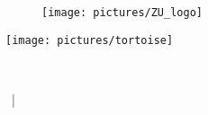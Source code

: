 
\begin{figure}[t]
	\flushright
	\texttt{[image: pictures/ZU\_logo]}
\end{figure}

\vspace*{3 cm}

\centering

\texttt{[image: pictures/tortoise]}




\centering {\Huge \Title}\\
\smallskip
\centering {\Large \Subtitle}


\vspace{\fill}


\centering \Name  ~| \Programme